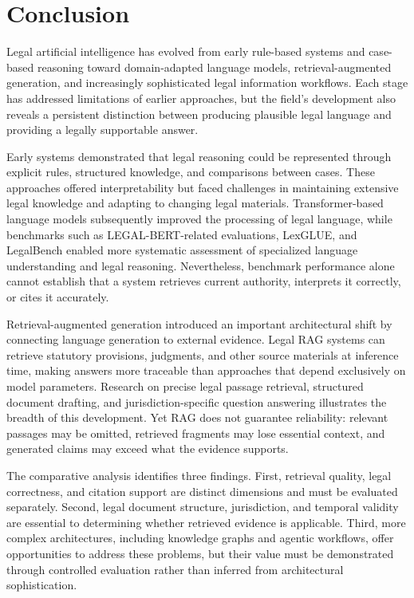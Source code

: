 \section{Conclusion}
\label{sec:conclusion}

Legal artificial intelligence has evolved from early rule-based systems and case-based reasoning toward
domain-adapted language models, retrieval-augmented generation, and increasingly sophisticated legal
information workflows. Each stage has addressed limitations of earlier approaches, but the field's
development also reveals a persistent distinction between producing plausible legal language and providing
a legally supportable answer.

Early systems demonstrated that legal reasoning could be represented through explicit rules, structured
knowledge, and comparisons between cases. These approaches offered interpretability but faced challenges
in maintaining extensive legal knowledge and adapting to changing legal materials. Transformer-based
language models subsequently improved the processing of legal language, while benchmarks such as
LEGAL-BERT-related evaluations, LexGLUE, and LegalBench enabled more systematic assessment of specialized
language understanding and legal reasoning. Nevertheless, benchmark performance alone cannot establish
that a system retrieves current authority, interprets it correctly, or cites it accurately.

Retrieval-augmented generation introduced an important architectural shift by connecting language
generation to external evidence. Legal RAG systems can retrieve statutory provisions, judgments, and other
source materials at inference time, making answers more traceable than approaches that depend exclusively
on model parameters. Research on precise legal passage retrieval, structured document drafting, and
jurisdiction-specific question answering illustrates the breadth of this development. Yet RAG does not
guarantee reliability: relevant passages may be omitted, retrieved fragments may lose essential context,
and generated claims may exceed what the evidence supports.

The comparative analysis identifies three findings. First, retrieval quality, legal correctness, and
citation support are distinct dimensions and must be evaluated separately. Second, legal document
structure, jurisdiction, and temporal validity are essential to determining whether retrieved evidence is
applicable. Third, more complex architectures, including knowledge graphs and agentic workflows, offer
opportunities to address these problems, but their value must be demonstrated through controlled
evaluation rather than inferred from architectural sophistication.

